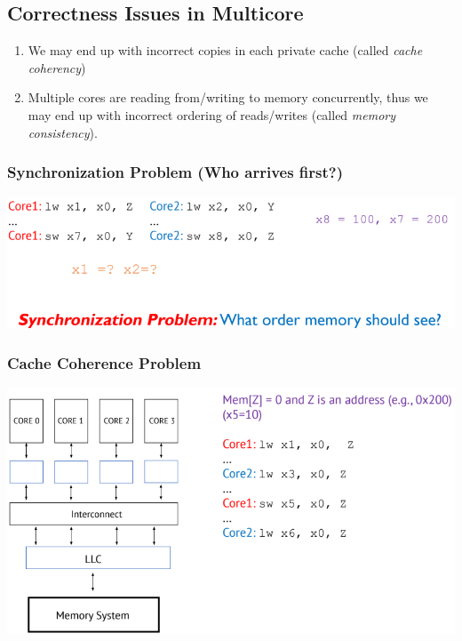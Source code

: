 \documentclass[10pt]{article}
\begin{document}
\subsection*{Correctness Issues in Multicore}
\begin{enumerate}
    \item We may end up with incorrect copies in each private cache (called \textit{cache coherency})
    \item Multiple cores are reading from/writing to memory concurrently, thus we may end up with incorrect ordering of reads/writes (called \textit{memory consistency}).
\end{enumerate}

\subsubsection*{Synchronization Problem (Who arrives first?)}
\begin{center}
    \includegraphics*[scale=0.8]{W8_8.png}
\end{center}

\subsubsection*{Cache Coherence Problem}
\begin{center}
    \includegraphics*[scale=0.8]{W8_7.png}
\end{center}
\end{document}
